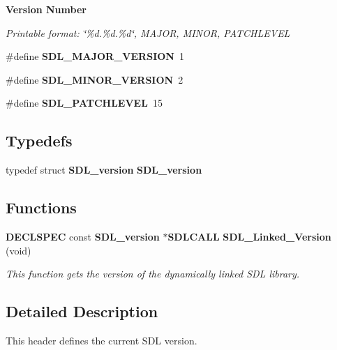 \begin{Indent}{\bf Version Number}\par
{\em Printable format\+: \char`\"{}\%d.\%d.\%d\char`\"{}, M\+A\+J\+O\+R, M\+I\+N\+O\+R, P\+A\+T\+C\+H\+L\+E\+V\+E\+L }\begin{DoxyCompactItemize}
\item 
\#define {\bfseries S\+D\+L\+\_\+\+M\+A\+J\+O\+R\+\_\+\+V\+E\+R\+S\+I\+O\+N}~1\label{_s_d_l__version_8h_a8fc808626be61507ade364b399f81468}

\item 
\#define {\bfseries S\+D\+L\+\_\+\+M\+I\+N\+O\+R\+\_\+\+V\+E\+R\+S\+I\+O\+N}~2\label{_s_d_l__version_8h_a2dd98e1cec119d54322cd9c8ea685c5c}

\item 
\#define {\bfseries S\+D\+L\+\_\+\+P\+A\+T\+C\+H\+L\+E\+V\+E\+L}~15\label{_s_d_l__version_8h_a84a0602cb43e6d9cefbdc119336019d5}

\end{DoxyCompactItemize}
\end{Indent}
\subsection*{Typedefs}
\begin{DoxyCompactItemize}
\item 
typedef struct {\bf S\+D\+L\+\_\+version} {\bfseries S\+D\+L\+\_\+version}\label{_s_d_l__version_8h_af87533c317dee86f75b51edd69541010}

\end{DoxyCompactItemize}
\subsection*{Functions}
\begin{DoxyCompactItemize}
\item 
{\bf D\+E\+C\+L\+S\+P\+E\+C} const {\bf S\+D\+L\+\_\+version} $\ast${\bf S\+D\+L\+C\+A\+L\+L} {\bf S\+D\+L\+\_\+\+Linked\+\_\+\+Version} (void)
\begin{DoxyCompactList}\small\item\em This function gets the version of the dynamically linked S\+D\+L library. \end{DoxyCompactList}\end{DoxyCompactItemize}


\subsection{Detailed Description}
This header defines the current S\+D\+L version. 



